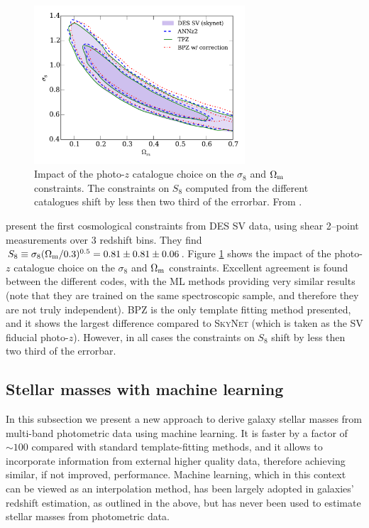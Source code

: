 \begin{figure}\centering \includegraphics[width=0.7\textwidth]{./chapters/chapter2/figs/Om_sig8_nz.pdf}\caption{Impact of the photo-$z$ catalogue choice on the $\sigma_8$ and $\Omega_{\rm m}$ constraints. The constraints on $S_8$ computed from the different catalogues shift by less then two third of the errorbar. From \citet{SVkey}.}\label{fig:keySV}\end{figure}

\citet{SVkey} present the first cosmological constraints from DES SV data, using shear 2--point measurements over 3 redshift bins. They find $S_8\equiv \sigma_8(\Omega_{\rm m}/0.3)^{0.5}=0.81\pm0.81\pm 0.06$. Figure \ref{fig:keySV} shows the impact of the photo-$z$ catalogue choice on the $\sigma_8$ and $\Omega_{\rm m}$ constraints. Excellent agreement is found between the different codes, with the ML methods providing very similar results (note that they are trained on the same spectroscopic sample, and therefore they are not truly independent). \textsc{BPZ} is the only template fitting method presented, and it shows the largest difference compared to \textsc{SkyNet} (which is taken as the SV fiducial photo-$z$). However, in all cases the constraints on $S_8$ shift by less then two third of the errorbar.


\subsection{Stellar masses with machine learning}

In this subsection we present a new approach to derive galaxy stellar masses from multi-band photometric data using machine learning. 
It is faster by a factor of $\sim 100$ compared with standard template-fitting methods, and it allows to incorporate information from external higher quality data, therefore achieving similar, if not improved, performance.
Machine learning, which in this context can be viewed as an interpolation method, has been largely adopted in galaxies' redshift estimation, as outlined in the above, but has never been used to estimate stellar masses from photometric data.

